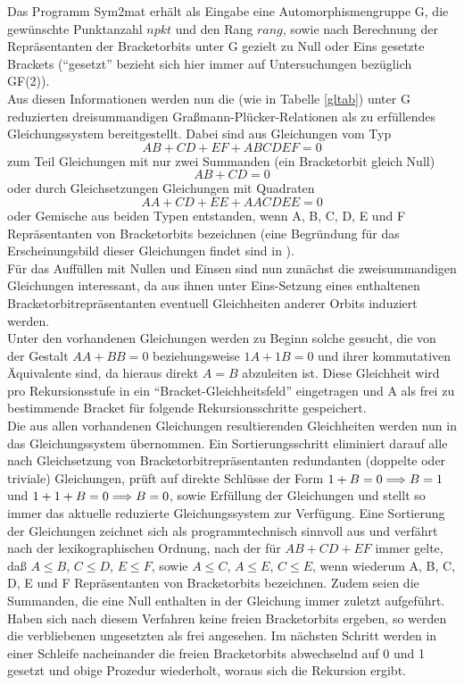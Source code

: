 Das Programm {\sc Sym2mat} erhält als Eingabe eine Automorphismengruppe G,
die gewünschte Punktanzahl $npkt$ und den Rang $rang$, sowie nach Berechnung
der Repräsentanten der Bracketorbits unter G gezielt zu Null oder Eins
gesetzte Brackets ("`gesetzt"' bezieht sich hier immer auf Untersuchungen
bezüglich GF(2)).\\
Aus diesen Informationen werden nun die (wie in Tabelle \ref{gltab}) unter G
reduzierten dreisummandigen Graßmann-Plücker-Relationen als zu erfüllendes
Gleichungssystem bereitgestellt. Dabei sind aus Gleichungen vom Typ
$$AB + CD + EF + ABCDEF = 0$$
zum Teil Gleichungen mit nur zwei Summanden (ein Bracketorbit gleich Null)
$$AB + CD = 0$$
oder durch Gleichsetzungen Gleichungen mit Quadraten
$$AA + CD + EE + AACDEE = 0$$
oder Gemische aus beiden Typen entstanden, wenn A, B, C, D, E und F
Repräsentanten von Bracketorbits bezeichnen (eine Begründung für das
Erscheinungsbild dieser Gleichungen findet sind in \cite{BoOlRi:91}).\\
Für das Auffüllen mit Nullen und Einsen sind nun zunächst die
zweisummandigen Gleichungen interessant, da aus ihnen unter Eins-Setzung
eines enthaltenen Bracketorbit\-repräsentanten eventuell Gleichheiten anderer
Orbits induziert werden.\\
Unter den vorhandenen Gleichungen werden zu Beginn solche gesucht, die von der
Gestalt $AA + BB = 0$ beziehungsweise $1A + 1B = 0$ und ihrer kommutativen
Äquivalente sind, da hieraus direkt $A = B$ abzuleiten ist. Diese Gleichheit
wird pro Rekursionsstufe in ein "`Bracket-Gleichheitsfeld"' eingetragen und A
als frei zu bestimmende Bracket für folgende Rekursionsschritte gespeichert.\\
Die aus allen vorhandenen Gleichungen resultierenden Gleichheiten werden nun
in das Gleichungssystem übernommen. Ein Sortierungsschritt eliminiert darauf
alle nach Gleichsetzung von Bracketorbitrepräsentanten redundanten (doppelte
oder triviale) Gleichungen, prüft auf direkte Schlüsse der Form
$1 + B = 0 \Longrightarrow B = 1$ und $1 + 1 + B = 0\Longrightarrow B = 0$, sowie Erfüllung
der Gleichungen und stellt so immer das aktuelle reduzierte Gleichungssystem
zur Verfügung. Eine Sortierung der Gleichungen zeichnet sich als
programmtechnisch sinnvoll aus und verfährt nach der lexikographischen Ordnung,
nach der für $AB + CD + EF$ immer gelte, daß $A\leq B$, $C\leq D$, $E\leq F$,
sowie $A\leq C$, $A\leq E$, $C\leq E$, wenn wiederum A, B, C, D, E und F
Repräsentanten von Bracketorbits bezeichnen. Zudem seien die Summanden, die
eine Null enthalten in der Gleichung immer zuletzt aufgeführt.\\
Haben sich nach diesem Verfahren keine freien Bracketorbits ergeben, so werden
die verbliebenen ungesetzten als frei angesehen. Im nächsten Schritt
werden in einer Schleife nacheinander die freien Bracketorbits abwechselnd auf
0 und 1 gesetzt und obige Prozedur wiederholt, woraus sich die Rekursion ergibt.

